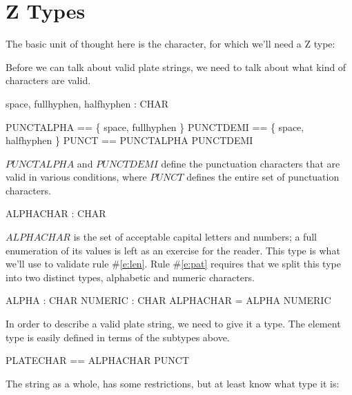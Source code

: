 \documentclass[11pt]{article}
\begin{document}
\section{Z Types}
\begin{spec}
  The basic unit of thought here is the character, for which we'll need a Z type:

  \begin{zed}
    [CHAR]
  \end{zed}

  Before we can talk about valid plate strings, we need to talk about what kind of characters are
  valid.  

  \begin{axdef}
    space, fullhyphen, halfhyphen : CHAR
  \end{axdef}

  \begin{zed}
    PUNCTALPHA == \{ space, fullhyphen \} \also
    PUNCTDEMI == \{ space, halfhyphen \} \also
    PUNCT == PUNCTALPHA \cup PUNCTDEMI
  \end{zed}

  $PUNCTALPHA$ and $PUNCTDEMI$ define the punctuation characters that are valid in various
  conditions, where $PUNCT$ defines the entire set of punctuation characters.

  \begin{axdef}
    ALPHACHAR : \power CHAR
  \end{axdef}

  $ALPHACHAR$ is the set of acceptable capital letters and numbers; a full enumeration of its values
  is left as an exercise for the reader.  This type is what we'll use to validate rule
  \#\ref{e:len}.  Rule \#\ref{e:pat} requires that we split this type into two distinct types,
  alphabetic and numeric characters.

  \begin{axdef}
    ALPHA : \power CHAR \also
    NUMERIC : \power CHAR \also
    \where
    ALPHACHAR = ALPHA \cup NUMERIC
  \end{axdef}

  In order to describe a valid plate string, we need to give it a type.  The element type is easily
  defined in terms of the subtypes above.

  \begin{zed}
    PLATECHAR == ALPHACHAR \cup PUNCT
  \end{zed}

  The string as a whole, has some restrictions, but at least know what type it is:


\end{spec}
\end{document}
